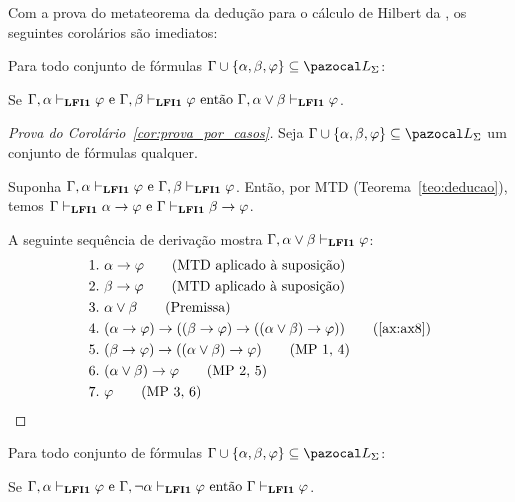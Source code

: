         Com a prova do metateorema da dedução para o cálculo de Hilbert da \lfium{}, os seguintes corolários são imediatos:

        \begin{corolario}\label{cor:prova_por_casos}
            Para todo conjunto de fórmulas $\Gamma \cup \{\alpha, \beta, \phi\} \subseteq \ling{}$:

            \centering
            {\normalfont{}Se $\Gamma, \alpha \vdash_{{\normalfont\textbf{LFI1}}{}} \varphi \text{ e }\Gamma, \beta \vdash_{{\normalfont\textbf{LFI1}}{}} \varphi \text{ então } \Gamma, \alpha \lor \beta \vdash_{{\normalfont\textbf{LFI1}}{}} \varphi$.}
        \end{corolario}

        \begin{proof}[Prova do Corolário~\ref{cor:prova_por_casos}]
            Seja $\Gamma \cup \{\alpha, \beta, \phi\} \subseteq \ling{}$ um conjunto de fórmulas qualquer.
            
            Suponha $\Gamma, \alpha \vdash_{{\normalfont\textbf{LFI1}}{}} \varphi \text{ e }\Gamma, \beta \vdash_{{\normalfont\textbf{LFI1}}{}} \varphi$. 
            Então, por MTD (Teorema~\ref{teo:deducao}), temos $\Gamma \vdash_{{\normalfont\textbf{LFI1}}{}} \alpha \to \varphi \text{ e }\Gamma \vdash_{{\normalfont\textbf{LFI1}}{}} \beta \to \varphi$.

            A seguinte sequência de derivação mostra $\Gamma, \alpha \lor \beta \vdash_{{\normalfont\textbf{LFI1}}{}} \varphi$:
            \begin{align*}
                1. ~& \alpha \to \phi \tag{MTD aplicado à suposição} \\
                2. ~& \beta \to \phi \tag{MTD aplicado à suposição} \\
                3. ~& \alpha \lor \beta \tag{Premissa} \\
                4. ~& (\alpha \to \phi) \to ((\beta \to \phi) \to ((\alpha \lor \beta) \to \phi)) \tag{\ref{ax:ax8}} \\
                5. ~& (\beta \to \phi) \to ((\alpha \lor \beta) \to \phi) \tag{MP 1, 4}\\
                6. ~& (\alpha \lor \beta) \to \phi \tag{MP 2, 5} \\
                7. ~& \phi \tag{MP 3, 6}
            \end{align*}
        \end{proof}


        \begin{corolario}\label{cor:caso_neg}
            Para todo conjunto de fórmulas $\Gamma \cup \{\alpha, \beta, \phi\} \subseteq \ling{}$:

            \centering
            {\normalfont{}Se $\Gamma, \alpha \vdash_{{\normalfont\textbf{LFI1}}{}} \varphi \text{ e }\Gamma, \neg\alpha \vdash_{{\normalfont\textbf{LFI1}}{}} \varphi \text{ então } \Gamma \vdash_{{\normalfont\textbf{LFI1}}{}} \varphi$.}
        \end{corolario}

